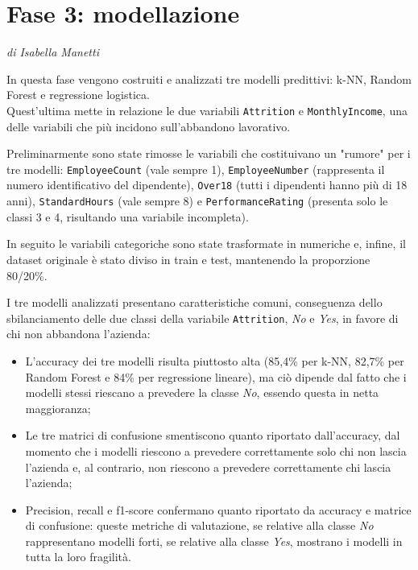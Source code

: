 \documentclass[12pt, a4paper]{article}
\begin{document}
\section{Fase 3: modellazione}
\textit{di Isabella Manetti}

In questa fase vengono costruiti e analizzati tre modelli predittivi: k-NN, Random Forest e regressione logistica. 
\\Quest'ultima mette in relazione le due variabili \texttt{Attrition} e \texttt{MonthlyIncome}, una delle variabili che più incidono sull'abbandono lavorativo.

Preliminarmente sono state rimosse le variabili che costituivano un "rumore" per i tre modelli: \texttt{EmployeeCount} (vale sempre 1), \texttt{EmployeeNumber} (rappresenta il numero identificativo del dipendente), \texttt{Over18} (tutti i dipendenti hanno più di 18 anni), \texttt{StandardHours} (vale sempre 8) e \texttt{PerformanceRating} (presenta solo le classi 3 e 4, risultando una variabile incompleta).

In seguito le variabili categoriche sono state trasformate in numeriche e, infine, il dataset originale è stato diviso in train e test, mantenendo la proporzione 80/20\%.

I tre modelli analizzati presentano caratteristiche comuni, conseguenza dello sbilanciamento delle due classi della variabile \texttt{Attrition}, \textit{No} e \textit{Yes}, in favore di chi non abbandona l'azienda:
\begin{itemize}
    \item L'accuracy dei tre modelli risulta piuttosto alta (85,4\% per k-NN, 82,7\% per Random Forest e 84\% per regressione lineare), ma ciò dipende dal fatto che i modelli stessi riescano a prevedere la classe \textit{No}, essendo questa in netta maggioranza;
    \item Le tre matrici di confusione smentiscono quanto riportato dall'accuracy, dal momento che i modelli riescono a prevedere correttamente solo chi non lascia l'azienda e, al contrario, non riescono a prevedere correttamente chi lascia l'azienda;
    \item Precision, recall e f1-score confermano quanto riportato da accuracy e matrice di confusione: queste metriche di valutazione, se relative alla classe \textit{No} rappresentano modelli forti, se relative alla classe \textit{Yes}, mostrano i modelli in tutta la loro fragilità.
\end{itemize}
\end{document}
